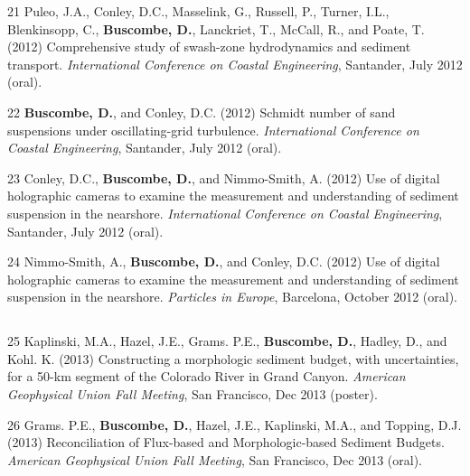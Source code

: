 \documentclass[margin,line]{resume}
\begin{document}
\begin{resume}
\begin{footnotesize}
\begin{list1}
	\item[21] Puleo, J.A., Conley, D.C., Masselink, G., Russell, P., Turner, I.L., Blenkinsopp, C., {\bf Buscombe, D.}, Lanckriet, T., McCall, R., and Poate, T. (2012) Comprehensive study of swash-zone hydrodynamics and sediment transport. {\sl International Conference on Coastal Engineering}, Santander, July 2012 (oral).\\

	\item[22] {\bf Buscombe, D.}, and Conley, D.C. (2012) Schmidt number of sand suspensions under oscillating-grid turbulence. {\sl International Conference on Coastal Engineering}, Santander, July 2012 (oral).\\

	\item[23] Conley, D.C., {\bf Buscombe, D.}, and Nimmo-Smith, A. (2012) Use of digital holographic cameras to examine the measurement and understanding of sediment suspension in the nearshore. {\sl International Conference on Coastal Engineering}, Santander, July 2012 (oral).\\

	\item[24] Nimmo-Smith, A., {\bf Buscombe, D.}, and Conley, D.C. (2012) Use of digital holographic cameras to examine the measurement and understanding of sediment suspension in the nearshore. {\sl Particles in Europe}, Barcelona, October 2012 (oral).
	\end{list1}

	\subsection{}
	\begin{list1}
	\item[25] Kaplinski, M.A., Hazel, J.E., Grams. P.E., {\bf Buscombe, D.}, Hadley, D., and Kohl. K. (2013) Constructing a morphologic sediment budget, with uncertainties, for a 50-km segment of the Colorado River in Grand Canyon.  {\sl American Geophysical Union Fall Meeting}, San Francisco, Dec 2013 (poster).\\

	\item[26] Grams. P.E., {\bf Buscombe, D.}, Hazel, J.E., Kaplinski, M.A., and Topping, D.J. (2013) Reconciliation of Flux-based and Morphologic-based Sediment Budgets. {\sl American Geophysical Union Fall Meeting}, San Francisco, Dec 2013 (oral). \\


\end{list1}
\end{footnotesize}
\end{resume}
\end{document}
